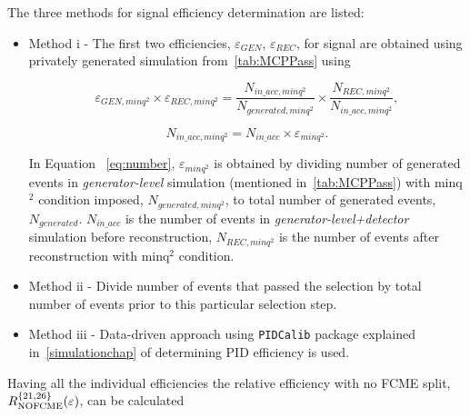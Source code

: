 The three methods for signal efficiency determination are listed:

\begin{itemize}
	\item Method \Rn{1} - The first two efficiencies, $\varepsilon_{GEN}$, $\varepsilon_{REC}$, for signal are obtained using privately generated simulation from~\autoref{tab:MCPPass} using

\begin{equation}
{\varepsilon_{GEN,minq^{2}}}\times {\varepsilon_{REC,minq^{2}}}= \frac{N_{in\_acc,minq^{2}}}{N_{generated,minq^{2}}}\times \frac{N_{REC,minq^{2}}}{N_{in\_acc,minq^{2}}},
\end{equation}

\begin{equation}
N_{in\_acc,minq^{2}} = N_{in\_acc} \times \varepsilon_{minq^{2}}.
\label{eq:number}
\end{equation}

In Equation ~\autoref{eq:number}, $\varepsilon_{minq^{2}}$ is obtained by dividing number of generated events in \textit{generator-level} simulation (mentioned in~\autoref{tab:MCPPass}) with minq$^2$ condition imposed, $N_{generated,minq^{2}}$, to total number of generated events, $N_{generated}$. $N_{in\_acc}$ is the number of events in \textit{generator-level+detector} simulation before reconstruction, $N_{REC,minq^{2}}$ is the number of events after reconstruction with minq$^2$ condition.
\item Method \Rn{2} - Divide number of events that passed the selection by total number of events prior to this particular selection step.
\item Method \Rn{3} - Data-driven approach using \texttt{PIDCalib} package explained in~\autoref{simulationchap} of determining PID efficiency is used.
\end{itemize}

Having all the individual efficiencies the relative efficiency with no FCME split, $R_{\rm{NOFCME}}^{\{21,26\}}(\varepsilon)$, can be calculated 


